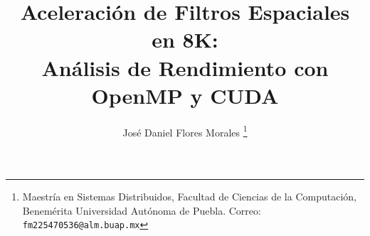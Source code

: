 \title{Aceleración de Filtros Espaciales en 8K:\\ Análisis de Rendimiento con OpenMP y CUDA}

\author{%
     José Daniel Flores Morales%
     \thanks{Maestría en Sistemas Distribuidos, Facultad de Ciencias de la Computación, Benemérita Universidad Autónoma de Puebla. Correo: {\tt fm225470536@alm.buap.mx}}
}

\maketitle
\markboth{}{}
\pagestyle{empty} 
\thispagestyle{empty}

